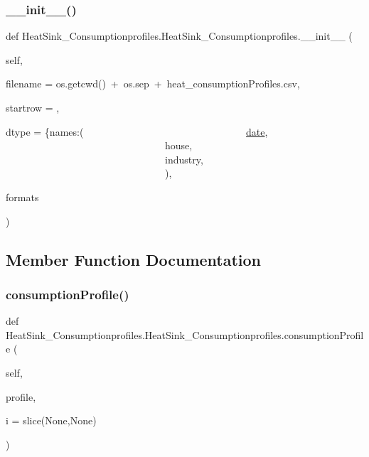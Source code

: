\subsubsection{\texorpdfstring{\+\_\+\+\_\+init\+\_\+\+\_\+()}{\_\_init\_\_()}}
{\footnotesize\ttfamily def Heat\+Sink\+\_\+\+Consumptionprofiles.\+Heat\+Sink\+\_\+\+Consumptionprofiles.\+\_\+\+\_\+init\+\_\+\+\_\+ (\begin{DoxyParamCaption}\item[{}]{self,  }\item[{}]{filename = {\ttfamily os.getcwd()~+~os.sep~+~\textquotesingle{}heat\+\_\+consumptionProfiles.csv\textquotesingle{}},  }\item[{}]{startrow = {},  }\item[{}]{dtype = {\ttfamily \{\textquotesingle{}names\textquotesingle{}\+:(
~~~~~~~~~~~~~~~~~~~~~~~~~~~~~~~~\textquotesingle{}\hyperlink{class_heat_sink___consumptionprofiles_1_1_heat_sink___consumptionprofiles_a5e52056f8f430a2aa642948af5246a2f}{date}\textquotesingle{},
~~~~~~~~~~~~~~~~~~~~~~~~~~~~~~~~\textquotesingle{}house\textquotesingle{},
~~~~~~~~~~~~~~~~~~~~~~~~~~~~~~~~\textquotesingle{}industry\textquotesingle{},
~~~~~~~~~~~~~~~~~~~~~~~~~~~~~~~~)},  }\item[{}]{formats }\end{DoxyParamCaption})}



\subsection{Member Function Documentation}
\mbox{\label{class_heat_sink___consumptionprofiles_1_1_heat_sink___consumptionprofiles_a62866d4ad34ff5cd3128356fd4996931}} 
\subsubsection{\texorpdfstring{consumption\+Profile()}{consumptionProfile()}}
{\footnotesize\ttfamily def Heat\+Sink\+\_\+\+Consumptionprofiles.\+Heat\+Sink\+\_\+\+Consumptionprofiles.\+consumption\+Profile (\begin{DoxyParamCaption}\item[{}]{self,  }\item[{}]{profile,  }\item[{}]{i = {\ttfamily slice(None,None)} }\end{DoxyParamCaption})}

